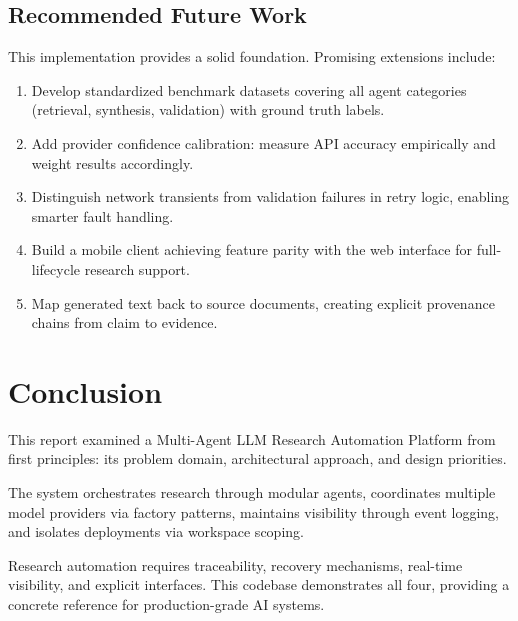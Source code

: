 \documentclass[12pt, a4paper]{article}
\begin{document}
\subsection{Recommended Future Work}

This implementation provides a solid foundation. Promising extensions include:

\begin{enumerate}[label=\textbf{\alph*.}]
  \item Develop standardized benchmark datasets covering all agent categories (retrieval,
        synthesis, validation) with ground truth labels.
  \item Add provider confidence calibration: measure API accuracy empirically and weight
        results accordingly.
  \item Distinguish network transients from validation failures in retry logic, enabling
        smarter fault handling.
  \item Build a mobile client achieving feature parity with the web interface for
        full-lifecycle research support.
  \item Map generated text back to source documents, creating explicit provenance chains
        from claim to evidence.
\end{enumerate}

\section{Conclusion}

This report examined a Multi-Agent LLM Research Automation Platform from first principles: its problem domain, architectural approach, and design priorities.

The system orchestrates research through modular agents, coordinates multiple model providers via factory patterns, maintains visibility through event logging, and isolates deployments via workspace scoping.

Research automation requires traceability, recovery mechanisms, real-time visibility, and explicit interfaces. This codebase demonstrates all four, providing a concrete reference for production-grade AI systems.
\end{document}
